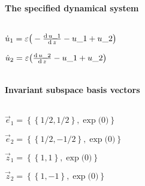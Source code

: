 \(
\)
\paragraph{The specified dynamical system}
\(
\)\par
\(\dot u_{1}=\varepsilon \big(-\frac{{\rm d}\,u\_1}{{\rm d}\,z}-u\_1+u\_2\big)
\)\par
\(\dot u_{2}=\varepsilon \big(\frac{{\rm d}\,u\_2}{{\rm d}\,z}-u\_1+u\_2\big)
\)\par
\(\)
\paragraph{Invariant subspace basis vectors}
\(
\)\par
\(\vec e_{1}=\left\{
\left\{
1/2 , 1/2
\right\} , \exp \big(0\big)
\right\}
\)\par
\(\vec e_{2}=\left\{
\left\{
1/2 , -1/2
\right\} , \exp \big(0\big)
\right\}
\)\par
\(\vec z_{1}=\left\{
\left\{
1 , 1
\right\} , \exp \big(0\big)
\right\}
\)\par
\(\vec z_{2}=\left\{
\left\{
1 , -1
\right\} , \exp \big(0\big)
\right\}
\)\par
